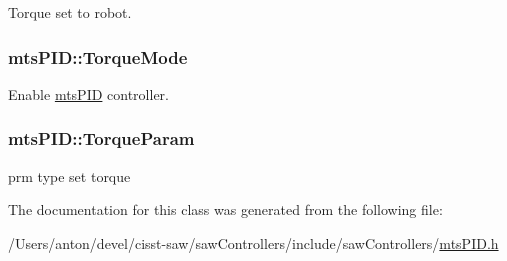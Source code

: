 Torque set to robot. 

\hypertarget{classmts_p_i_d_a7bd7ccfcdc69d5d5b91087f019c01c63}{}
\subsubsection[{Torque\+Mode}]{ mts\+P\+I\+D\+::\+Torque\+Mode\hspace{0.3cm}{\ttfamily [protected]}}\label{classmts_p_i_d_a7bd7ccfcdc69d5d5b91087f019c01c63}


Enable \hyperlink{classmts_p_i_d}{mts\+P\+I\+D} controller. 

\hypertarget{classmts_p_i_d_a5aab0504bce1d2293bfbbc2eeec3f1f9}{}
\subsubsection[{Torque\+Param}]{ mts\+P\+I\+D\+::\+Torque\+Param\hspace{0.3cm}{\ttfamily [protected]}}\label{classmts_p_i_d_a5aab0504bce1d2293bfbbc2eeec3f1f9}


prm type set torque 



The documentation for this class was generated from the following file\+:\begin{DoxyCompactItemize}
\item 
/\+Users/anton/devel/cisst-\/saw/saw\+Controllers/include/saw\+Controllers/\hyperlink{mts_p_i_d_8h}{mts\+P\+I\+D.\+h}\end{DoxyCompactItemize}
